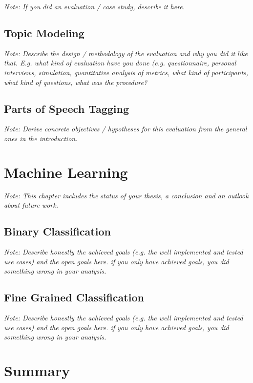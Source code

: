 \documentclass[a4paper,12pt,twoside]{report}
\begin{document}
\textit{Note: If you did an evaluation / case study, describe it here.}

\section{Topic Modeling}

\textit{Note: Describe the design / methodology of the evaluation and why you did it like that. E.g. what kind of evaluation have you done (e.g. questionnaire, personal interviews, simulation, quantitative analysis of metrics, what kind of participants, what kind of questions, what was the procedure?}

\section{Parts of Speech Tagging}

\textit{Note: Derive concrete objectives / hypotheses for this evaluation from the general ones in the introduction.}


\chapter{Machine Learning}

\textit{Note: This chapter includes the status of your thesis, a conclusion and an outlook about future work.}

\section{Binary Classification}

\textit{Note: Describe honestly the achieved goals (e.g. the well implemented and tested use cases) and the open goals here. if you only have achieved goals, you did something wrong in your analysis.}

\section{Fine Grained Classification}

\textit{Note: Describe honestly the achieved goals (e.g. the well implemented and tested use cases) and the open goals here. if you only have achieved goals, you did something wrong in your analysis.}


\chapter{Summary}
\end{document}
